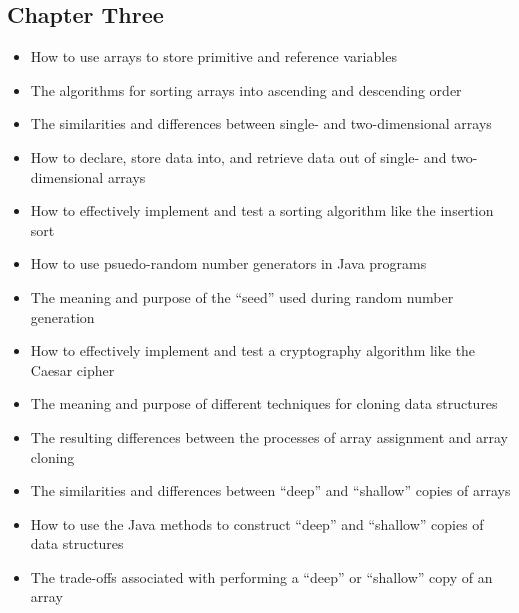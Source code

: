 \documentclass[11pt]{article}
\begin{document}
\vspace*{-.2in}
\subsection*{Chapter Three}

\begin{itemize}

  \item How to use arrays to store primitive and reference variables

  \item The algorithms for sorting arrays into ascending and descending order

  \item The similarities and differences between single- and two-dimensional
    arrays

  \item How to declare, store data into, and retrieve data out of single- and
    two-dimensional arrays

  \item How to effectively implement and test a sorting algorithm like the
    insertion sort

  \item How to use psuedo-random number generators in Java programs

  \item The meaning and purpose of the ``seed'' used during random number
    generation


  \item How to effectively implement and test a cryptography algorithm like the
    Caesar cipher

  \item The meaning and purpose of different techniques for cloning data structures

  \item The resulting differences between the processes of array assignment and
    array cloning

  \item The similarities and differences between ``deep'' and ``shallow'' copies
    of arrays

  \item How to use the Java methods to construct ``deep'' and ``shallow'' copies
    of data structures

  \item The trade-offs associated with performing a ``deep'' or ``shallow'' copy
    of an array

\end{itemize}
\end{document}
